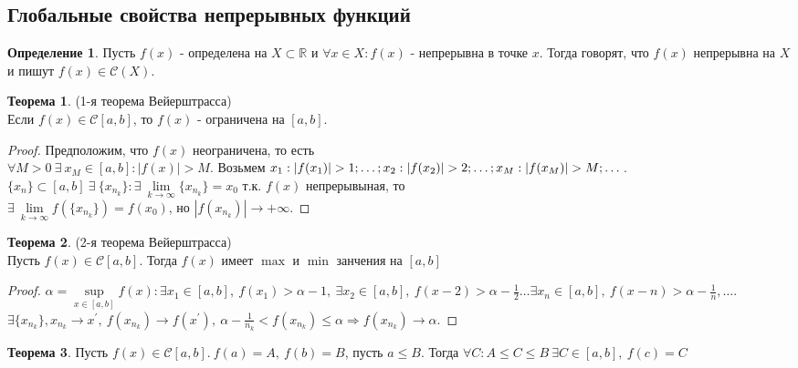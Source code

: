 \documentclass[a4paper, 12pt]{article}
\newcommand{\R}{\mathbb{R}}
\theoremstyle{definition}
\newtheorem*{definition}{Определение}
\newtheorem*{theorem}{Теорема}
\begin{document}
    \subsection{Глобальные свойства непрерывных функций}
        \begin{definition}
            Пусть $f(x)$ - определена на $X\subset \R$ и $\forall x\in X: f(x)$ - непрерывна в точке $x$. Тогда говорят, что $f(x)$ непрерывна на $X$ и пишут $f(x)\in \mathcal{C}(X)$.
        \end{definition} 
        \begin{theorem} (1-я теорема Вейерштрасса)\\
            Если $f(x)\in \mathcal{C}[a,b]$, то $f(x)$ - ограничена на $[a,b]$.
        \end{theorem} 
        \begin{proof}
            Предположим, что $f(x)$ неограничена, то есть\\
            $\forall M>0\ \exists\ x_M\in [a,b]: |f(x)|>M$. Возьмем $x_1: |f(x_1)|>1;\dots;\\
            x_2: |f(x_2)|>2; \dots; x_M: |f(x_M)|>M;\dots$.\\
            $\{x_n\}\subset [a,b]\ \exists\ \{x_{n_k}\}: \exists\ \lim\limits_{k\to \infty}\{x_{n_k}\}=x_0$ т.к. $f(x)$ непрерывыная, то\\
            $\exists\ \lim\limits_{k\to \infty}f(\{x_{n_k}\})=f(x_0)$, но $|f(x_{n_k})|\to +\infty$. 
        \end{proof} 
        \begin{theorem} (2-я теорема Вейерштрасса)\\
            Пусть $f(x)\in \mathcal{C}[a,b]$. Тогда $f(x)$ имеет $\max$ и $\min$ занчения на $[a,b]$
        \end{theorem} 
        \begin{proof}
            $\alpha = \sup\limits_{x\in [a,b]} f(x): \exists x_1 \in [a,b],\ f(x_1)>\alpha-1,\ \exists x_2\in [a,b],\ f(x-2)>\alpha - \frac{1}{2}\dots \exists x_n\in [a,b],\ f(x-n)>\alpha - \frac{1}{n}, \dots$. $\exists \{x_{n_k}\}, x_{n_k}\to x^{\prime},\ f(x_{n_k})\to f(x^{\prime}),\ \alpha-\frac{1}{n_k}<f(x_{n_k})\leq \alpha \Rightarrow f(x_{n_k})\to \alpha$.
        \end{proof} 
        \begin{theorem}
            Пусть $f(x)\in \mathcal{C}[a,b].\ f(a)=A,\ f(b)=B$, пусть $a\leq B$. Тогда $\forall C: A\leq C\leq B\ \exists C\in [a,b],\ f(c)=C$
        \end{theorem} 
\end{document}
